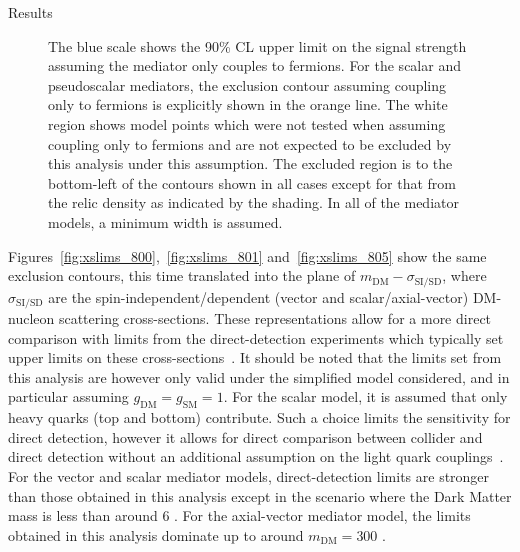 \begin{section}{Results}
\begin{figure}[htbp]
{The blue scale shows the 90\% CL upper limit on the signal strength assuming the mediator only couples to fermions. For the scalar and pseudoscalar mediators, the exclusion 
contour assuming coupling only to fermions is explicitly shown in the orange line. The white region shows model points which were not tested when assuming coupling only 
to fermions and are not expected to be excluded by this analysis under this assumption.
The excluded region is to the bottom-left of the contours shown in all cases except for that from the relic density as indicated by the shading.
In all of the mediator models, a minimum width is assumed\label{fig:masslims}.}
\end{figure}



Figures~\ref{fig:xslims_800},~\ref{fig:xslims_801} and~\ref{fig:xslims_805} show the same exclusion contours, this time translated into the 
plane of $m_{\textrm{DM}}-\sigma_{\textrm{SI/SD}}$, where $\sigma_{\textrm{SI/SD}}$ are 
the spin-independent/dependent (vector and scalar/axial-vector) DM-nucleon scattering 
cross-sections. These representations allow for a more direct comparison with limits from the direct-detection experiments which typically set 
upper limits on these cross-sections~\cite{ Malik:2014ggr,Harris:2015kda}. It should be noted that the limits set from this 
analysis are however only valid under the simplified model considered, and in particular 
assuming $g_{\textrm{DM}}=g_{\textrm{SM}}=1$. For the scalar model, it is assumed that only heavy quarks 
(top and bottom) contribute. Such a choice limits the sensitivity for direct 
detection, however it allows for direct comparison between collider and direct detection without an additional assumption 
on the light quark couplings~\cite{Harris:2015kda}.  
For the vector and scalar mediator models, direct-detection limits are stronger than 
those obtained in this analysis except in the scenario where the Dark Matter mass is less than around 6 \GeV. For the axial-vector mediator model, the 
limits obtained in this analysis dominate up to around $m_{\mathrm{DM}}=300$ \GeV. 
 

\end{section}
